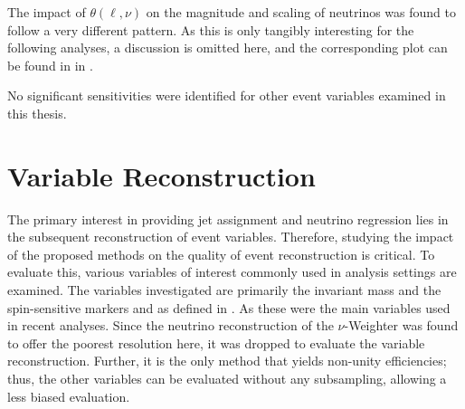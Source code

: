 The impact of $\theta(\ell,\nu)$ on the magnitude and scaling of neutrinos was found to follow a very different pattern. As this is only tangibly interesting for the following analyses, a discussion is omitted here, and the corresponding plot can be found in  in .

No significant sensitivities were identified for other event variables examined in this thesis.

\section{Variable Reconstruction}
\label{sec:evaluation:variable-reconstruction}
The primary interest in providing jet assignment and neutrino regression lies in the subsequent reconstruction of event variables.
Therefore, studying the impact of the proposed methods on the quality of event reconstruction is critical. To evaluate this, various variables of interest commonly used in analysis settings are examined. The variables investigated are primarily the invariant mass \mttbar and the spin-sensitive markers \chel and \chan as defined in . As these were the main variables used in recent \atlas analyses. Since the neutrino reconstruction of the $\nu$-Weighter was found to offer the poorest resolution here, it was dropped to evaluate the variable reconstruction. Further, it is the only method that yields non-unity efficiencies; thus, the other variables can be evaluated without any subsampling, allowing a less biased evaluation.

